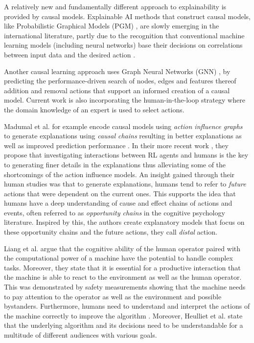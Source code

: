 \documentclass[twoside,11pt]{article}
\begin{document}

A relatively new and fundamentally different approach to explainability is provided by causal models. Explainable AI methods that construct causal models, like Probabilistic Graphical Models (PGM) \cite{Koller:2009:ProbabilisticGraphicalModelsBook}, \cite{Saranti:2019:LearningCompetencePGMs} are slowly emerging in the international literature, 
partly due to the recognition that conventional machine learning models (including neural networks) base their decisions on correlations between input data and the desired action  \cite{Lapuschkin:2019:UnmaskingCleverHans}. 

Another causal learning approach uses Graph Neural Networks (GNN) \cite{Vu:2020:PGMExplainer}, by predicting the performance-driven search of nodes, edges and features thereof addition and removal actions that support an informed creation of a causal model. Current work is also incorporating the human-in-the-loop strategy \cite{Holzinger:2016:iML} where the domain knowledge of an expert is used to select actions. 

Madumal et al. for example encode causal models using \emph{action influence graphs} to generate explanations using \emph{causal chains} resulting in better explanations as well as improved prediction performance \cite{MadumalEtAl:2020:CausalRLCFs}. In their more recent work \cite{Madumal:2020:DistalEF}, they propose that investigating interactions between RL agents and humans is the key to generating finer details in the explanations thus alleviating some of the shortcomings of the action influence models. An insight gained through their human studies was that to generate explanations, humans tend to refer to \emph{future} actions that were dependent on the current ones. This supports the idea that humans have a deep understanding of cause and effect chains of actions and events, often referred to as \emph{opportunity chains} in the cognitive psychology literature. Inspired by this, the authors create explanatory models that focus on these opportunity chains and the future actions, they call \emph{distal} action. 

Liang et al. \cite{LiangEtAl:2017:HITLReinforcementLearn} argue that the cognitive ability of the human operator paired with the computational power of a machine have the potential to handle complex tasks. Moreover, they state that it is essential for a productive interaction that the machine is able to react to the environment as well as the human operator. This was demonstrated by safety measurements showing that the machine needs to pay attention to the operator as well as the environment and possible bystanders. Furthermore, humans need to understand and interpret the actions of the machine correctly to improve the algorithm \cite{heuillet2021explainability}. Moreover, Heulliet et al. \cite{heuillet2021explainability} state that the underlying algorithm and its decisions need to be understandable for a multitude of different audiences with various goals.
\end{document}
